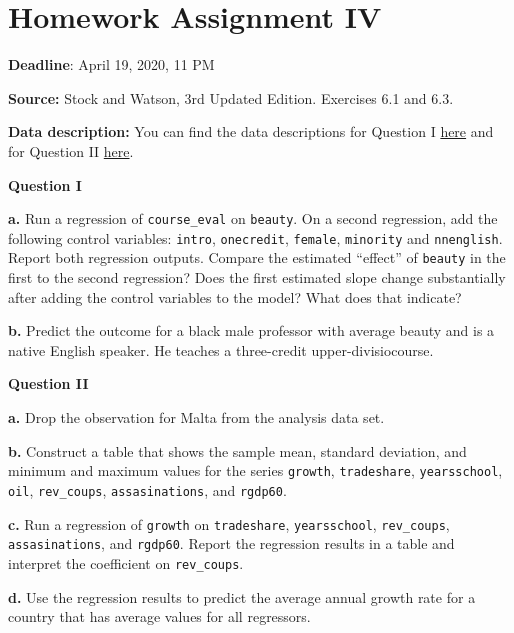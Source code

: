 \documentclass[
]{book}
\begin{document}
\hypertarget{homework-assignment-iv}{%
\chapter{Homework Assignment IV}\label{homework-assignment-iv}}

\textbf{Deadline}: April 19, 2020, 11 PM

\textbf{Source:} Stock and Watson, 3rd Updated Edition. Exercises 6.1 and 6.3.

\textbf{Data description:} You can find the data descriptions for Question I \href{https://wps.pearsoned.com/wps/media/objects/11422/11696965/empirical/empex_tb/TeachingRatings_Description.pdf}{here} and for Question II \href{https://wps.pearsoned.com/wps/media/objects/11422/11696965/empirical/empex_tb/Growth_Description.pdf}{here}.

\textbf{Question I}

\textbf{a.} Run a regression of \texttt{course\_eval} on \texttt{beauty}. On a second regression, add the following control variables: \texttt{intro}, \texttt{onecredit}, \texttt{female}, \texttt{minority} and \texttt{nnenglish}. Report both regression outputs. Compare the estimated ``effect'' of \texttt{beauty} in the first to the second regression? Does the first estimated slope change substantially after adding the control variables to the model? What does that indicate?

\textbf{b.} Predict the outcome for a black male professor with average beauty and is a native English speaker. He teaches a three-credit upper-divisiocourse.

\textbf{Question II}

\textbf{a.} Drop the observation for Malta from the analysis data set.

\textbf{b.} Construct a table that shows the sample mean, standard deviation, and minimum and maximum values for the series \texttt{growth}, \texttt{tradeshare}, \texttt{yearsschool}, \texttt{oil}, \texttt{rev\_coups}, \texttt{assasinations}, and \texttt{rgdp60}.

\textbf{c.} Run a regression of \texttt{growth} on \texttt{tradeshare}, \texttt{yearsschool}, \texttt{rev\_coups}, \texttt{assasinations}, and \texttt{rgdp60}. Report the regression results in a table and interpret the coefficient on \texttt{rev\_coups}.

\textbf{d.} Use the regression results to predict the average annual growth rate for a country that has average values for all regressors.
\end{document}
